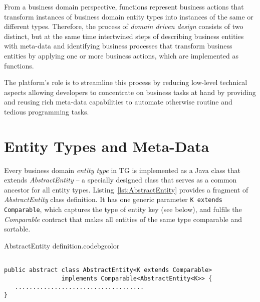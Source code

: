   From a business domain perspective, functions represent business actions that transform instances of business domain entity types into instances of the same or different types.
  Therefore, the process of \emph{domain driven design} consists of two distinct, but at the same time intertwined steps of describing business entities with meta-data and identifying business processes that transform business entities by applying one or more business actions, which are implemented as functions.
  
  The platform's role is to streamline this process by reducing low-level technical aspects allowing developers to concentrate on business tasks at hand by providing and reusing rich meta-data capabilities to automate otherwise routine and tedious programming tasks.

\section{Entity Types and Meta-Data}

  Every business domain \emph{entity type} in TG is implemented as a Java class that extends \emph{AbstractEntity} -- a specially designed class that serves as a common ancestor for all entity types.
  Listing~\ref{lst:AbstractEntity} provides a fragment of \emph{AbstractEntity} class definition.
  It has one generic parameter \texttt{K extends Comparable}, which captures the type of entity key (see below), and fulfils the \emph{Comparable} contract that makes all entities of the same type comparable and sortable.
  
  \begin{code}{AbstractEntity definition.}{\label{lst:AbstractEntity}}{codebgcolor}
    \begin{lstlisting}

public abstract class AbstractEntity<K extends Comparable> 
                implements Comparable<AbstractEntity<K>> {
   ....................................
}
    \end{lstlisting}
  \end{code}


